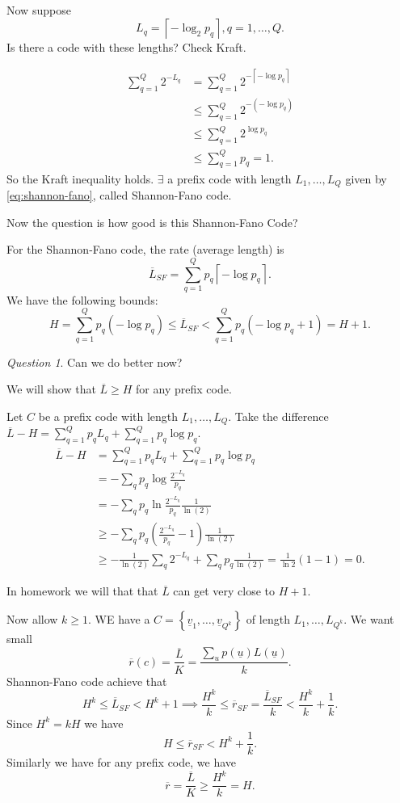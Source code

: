 \documentclass{report}
\newcommand{\ceil}[1]{\left\lceil #1 \right\rceil}
\newcommand{\set}[1]{\left\lbrace #1 \right\rbrace}
\theoremstyle{definition}
\theoremstyle{remark}
\newtheorem*{question}{Question}
\numberwithin{equation}{section}
\begin{document}
Now suppose
\begin{equation}\label{eq:shannon-fano}
  L_q = \ceil{-\log_2 p_q}, q = 1, \ldots, Q.  
\end{equation}
Is there a code with these lengths? Check Kraft.

\begin{align*}
  \sum_{q=1}^Q 2^{-L_q} & = \sum_{q=1}^Q 2^{-\ceil{-\log p_q}} \\
  & \leq \sum_{q=1}^Q 2^{-(-\log p_q)} \\
  & \leq \sum_{q=1}^Q 2^{\log p_q} \\
  & \leq \sum_{q=1}^Q p_q = 1.
\end{align*}
So the Kraft inequality holds. $\exists$ a prefix code with length $L_1, \ldots, L_Q$ given by \eqref{eq:shannon-fano}, called Shannon-Fano code.

Now the question is how good is this Shannon-Fano Code?

For the Shannon-Fano code, the rate (average length) is \[
  \overline{L}_{SF} = \sum_{q=1}^Q p_q\ceil{-\log p_q}.  
\]
We have the following bounds:
\[
  H = \sum_{q=1}^Q p_q(-\log p_q) \leq \overline{L}_{SF} < \sum_{q=1}^Q p_q(-\log p_q + 1) = H+1.
\]

\begin{question}
  Can we do better now?
\end{question}
We will show that $\overline{L} \geq H$ for any prefix code.

Let $C$ be a prefix code with length $L_1, \ldots, L_Q$. Take the difference $\overline{L}- H = \sum_{q=1}^Q p_qL_q + \sum_{q=1}^Q p_q \log p_q$.
\begin{align*}
  \overline{L} - H & = \sum_{q=1}^Q p_qL_q + \sum_{q=1}^Q p_q \log p_q \\
  & = -\sum_q p_q \log \frac{2^{-L_q}}{p_q} \\
  & = -\sum_q p_q \ln \frac{2^{-L_q}}{p_q} \frac{1}{\ln(2)} \\
  & \geq -\sum_q p_q \left(\frac{2^{-L_q}}{p_q} - 1\right)\frac{1}{\ln(2)}  \\
  & \geq -\frac{1}{\ln(2)}\sum_q 2^{-L_q} + \sum_q p_q \frac{1}{\ln(2)} = \frac{1}{\ln 2}(1 - 1) = 0.
\end{align*}

In homework we will that that $\overline{L}$ can get very close to $H + 1$.

Now allow $k \geq 1$. WE have a $C=\set{\underline{v}_1, \ldots, \underline{v}_{Q^k}}$ of length $L_1, \ldots, L_{Q^k}$. We want small \[
  \overline{r}(c) = \frac{\overline{L}}{K} = \frac{\sum_u p(\underline{u})L(\underline{u})}{k}.  
\]
Shannon-Fano code achieve that \[
  H^k \leq \overline{L}_{SF} < H^k + 1 \implies \frac{H^k}{k} \leq \overline{r}_{SF} = \frac{\overline{L}_{SF}}{k} < \frac{H^k}{k} + \frac{1}{k}.  
\]
Since $H^k = kH$ we have \[
  H \leq \overline{r}_{SF} < H^k + \frac{1}{k}.
\]
Similarly we have for any prefix code, we have \[
  \overline{r} = \frac{\overline{L}}{K} \geq \frac{H^k}{k} = H.
\]
\end{document}
